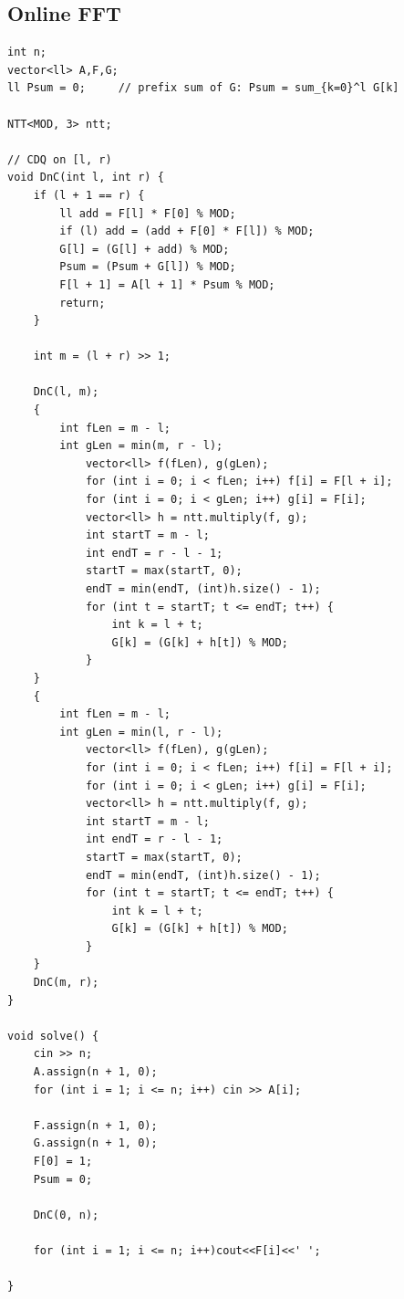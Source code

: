 \documentclass[landscape, 8pt, a4paper, oneside, twocolumn]{extarticle}
\begin{document}
\subsection{Online FFT}
\begin{verbatim}
int n;
vector<ll> A,F,G;
ll Psum = 0;     // prefix sum of G: Psum = sum_{k=0}^l G[k]

NTT<MOD, 3> ntt;

// CDQ on [l, r)
void DnC(int l, int r) {
    if (l + 1 == r) {
        ll add = F[l] * F[0] % MOD;
        if (l) add = (add + F[0] * F[l]) % MOD;
        G[l] = (G[l] + add) % MOD;
        Psum = (Psum + G[l]) % MOD;
        F[l + 1] = A[l + 1] * Psum % MOD;
        return;
    }

    int m = (l + r) >> 1;

    DnC(l, m);
    {
        int fLen = m - l;
        int gLen = min(m, r - l);
            vector<ll> f(fLen), g(gLen);
            for (int i = 0; i < fLen; i++) f[i] = F[l + i];
            for (int i = 0; i < gLen; i++) g[i] = F[i];
            vector<ll> h = ntt.multiply(f, g);
            int startT = m - l;
            int endT = r - l - 1;
            startT = max(startT, 0);
            endT = min(endT, (int)h.size() - 1);
            for (int t = startT; t <= endT; t++) {
                int k = l + t;
                G[k] = (G[k] + h[t]) % MOD;
            }
    }
    {
        int fLen = m - l;
        int gLen = min(l, r - l);
            vector<ll> f(fLen), g(gLen);
            for (int i = 0; i < fLen; i++) f[i] = F[l + i];
            for (int i = 0; i < gLen; i++) g[i] = F[i];
            vector<ll> h = ntt.multiply(f, g);
            int startT = m - l;
            int endT = r - l - 1;
            startT = max(startT, 0);
            endT = min(endT, (int)h.size() - 1);
            for (int t = startT; t <= endT; t++) {
                int k = l + t;
                G[k] = (G[k] + h[t]) % MOD;
            }
    }
    DnC(m, r);
}

void solve() {
    cin >> n;
    A.assign(n + 1, 0);
    for (int i = 1; i <= n; i++) cin >> A[i];

    F.assign(n + 1, 0);
    G.assign(n + 1, 0);
    F[0] = 1;
    Psum = 0;

    DnC(0, n);

    for (int i = 1; i <= n; i++)cout<<F[i]<<' ';

}
\end{verbatim}
\end{document}

